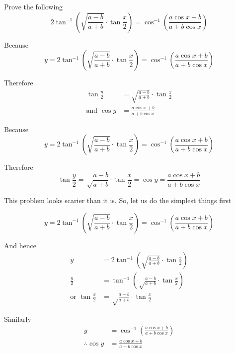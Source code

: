 \documentclass[14pt,fleqn]{extarticle}
\newcommand\ea{\frac{a-b}{a+b}}
\begin{document}
\begin{question}
	\statement 
    
     Prove the following 
     \small\[ 2\tan^{-1} \left(\sqrt{\ea}\cdot\tan \frac{x}{2} \right) = \cos^{-1} \left(\frac{a\cos x + b}{a + b\cos x} \right)\] \normalsize
     
     \begin{step}
  \begin{options} 
     \correct 
       
       Because 
       \small\[ y = 2\tan^{-1} \left(\sqrt{\ea}\cdot\tan \frac{x}{2} \right) = \cos^{-1} \left(\frac{a\cos x + b}{a + b\cos x} \right)\] \normalsize
       
       Therefore 
       \begin{align}
	\tan \frac{y}{2} &= \sqrt{\ea}\cdot\tan \frac{x}{2} \\
	\text{and } \cos y &= \frac{a\cos x + b}{a + b\cos x}
\end{align}

\incorrect
 
Because 
       \small\[ y = 2\tan^{-1} \left(\sqrt{\ea}\cdot\tan \frac{x}{2} \right) = \cos^{-1} \left(\frac{a\cos x + b}{a + b\cos x} \right)\] \normalsize

Therefore 
\[ \tan \frac{y}{2} = \sqrt\ea\cdot\tan \frac{x}{2} = \cos y = \frac{a\cos x + b}{a + b\cos x}\]       
        
    \end{options} 
     \reason 
     
     This problem looks scarier than it is. So, let us do the simplest things first 
     
     \small\[ y = 2\tan^{-1} \left(\sqrt{\ea}\cdot\tan \frac{x}{2} \right) = \cos^{-1} \left(\frac{a\cos x + b}{a + b\cos x} \right)\] \normalsize
     
     And hence 
     \begin{align}
     y &= 2\tan^{-1} \left(\sqrt{\ea}\cdot\tan \frac{x}{2} \right) \\
     \frac{y}{2} &= \tan^{-1} \left(\sqrt\ea\cdot\tan \frac{x}{2} \right) \\
     \text{or } \tan \frac{x}{2} &= \sqrt\ea\cdot\tan\frac{x}{2}
\end{align}

Similarly 
\begin{align}
y &= \cos^{-1} \left( \frac{a\cos x + b}{a + b\cos x}\right) \\
	\therefore \cos y &= \frac{a\cos x + b}{a + b\cos x}
\end{align}
       

\end{step}
\end{question}
\end{document}
